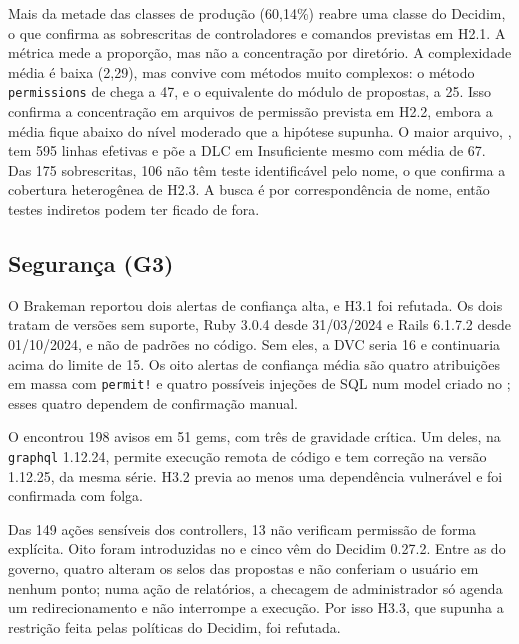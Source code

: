 \documentclass[journal]{IEEEtran}
\begin{document}
Mais da metade das classes de produção (60,14\%) reabre uma classe do Decidim, o que confirma as sobrescritas de controladores e comandos previstas em H2.1. A métrica mede a proporção, mas não a concentração por diretório. A complexidade média é baixa (2,29), mas convive com métodos muito complexos: o método \texttt{permissions} de  chega a 47, e o equivalente do módulo de propostas, a 25. Isso confirma a concentração em arquivos de permissão prevista em H2.2, embora a média fique abaixo do nível moderado que a hipótese supunha. O maior arquivo, , tem 595 linhas efetivas e põe a DLC em Insuficiente mesmo com média de 67. Das 175 sobrescritas, 106 não têm teste identificável pelo nome, o que confirma a cobertura heterogênea de H2.3. A busca é por correspondência de nome, então testes indiretos podem ter ficado de fora.

\subsection{Segurança (G3)}
\label{sec:res_g3}

O Brakeman reportou dois alertas de confiança alta, e H3.1 foi refutada. Os dois tratam de versões sem suporte, Ruby 3.0.4 desde 31/03/2024 e Rails 6.1.7.2 desde 01/10/2024, e não de padrões no código. Sem eles, a DVC seria 16 e continuaria acima do limite de 15. Os oito alertas de confiança média são quatro atribuições em massa com \texttt{permit!} e quatro possíveis injeções de SQL num model criado no ; esses quatro dependem de confirmação manual.

O  encontrou 198 avisos em 51 gems, com três de gravidade crítica. Um deles, na \texttt{graphql} 1.12.24, permite execução remota de código e tem correção na versão 1.12.25, da mesma série. H3.2 previa ao menos uma dependência vulnerável e foi confirmada com folga.

Das 149 ações sensíveis dos controllers, 13 não verificam permissão de forma explícita. Oito foram introduzidas no  e cinco vêm do Decidim 0.27.2. Entre as do governo, quatro alteram os selos das propostas e não conferiam o usuário em nenhum ponto; numa ação de relatórios, a checagem de administrador só agenda um redirecionamento e não interrompe a execução. Por isso H3.3, que supunha a restrição feita pelas políticas do Decidim, foi refutada.
\end{document}
